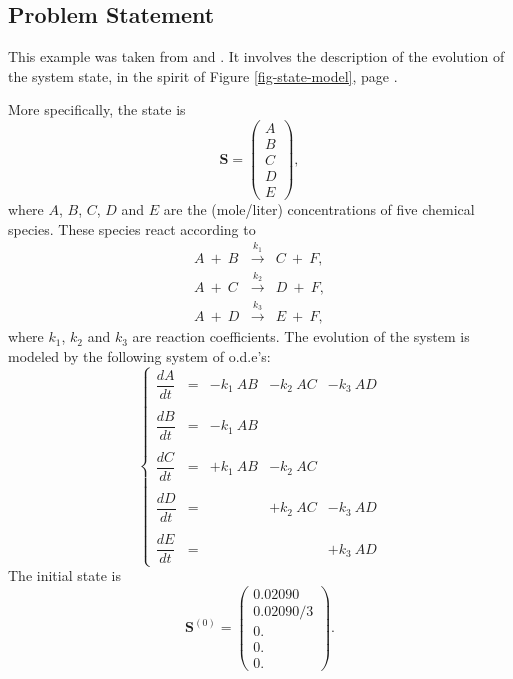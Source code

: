 \subsection{Problem Statement}\label{subsc-gmc-dram-chem-ex-prob-statement}

This example was taken from \cite{mcmctool} and \cite[ex. 9.9, page 326]{Hi70}.
It involves the description of the evolution of the system state, in the spirit of Figure \ref{fig-state-model}, page \pageref{fig-state-model}.

More specifically, the state is
\begin{equation*}
\mathbf{S}=
\left(
\begin{array}{c}
A \\
B \\
C \\
D \\
E
\end{array}
\right),
\end{equation*}
where $A$, $B$, $C$, $D$ and $E$ are the (mole/liter) concentrations of five chemical species.
These species react according to 
\begin{eqnarray*}
A~+~B & \xrightarrow{~k_1~} & C~+~F,\\
A~+~C & \xrightarrow{~k_2~} & D~+~F,\\
A~+~D & \xrightarrow{~k_3~} & E~+~F,
\end{eqnarray*}
where $k_1$, $k_2$ and $k_3$ are reaction coefficients.
The evolution of the system is modeled by the following system of o.d.e's:
\begin{equation*}
\left\{
\begin{array}{ccccc}
\dfrac{dA}{dt} & = & -k_1~AB & -k_2~AC & -k_3~AD \\
& & & & \\
\dfrac{dB}{dt} & = & -k_1~AB &         &         \\
& & & & \\
\dfrac{dC}{dt} & = & +k_1~AB & -k_2~AC &         \\
& & & & \\
\dfrac{dD}{dt} & = &         & +k_2~AC & -k_3~AD \\
& & & & \\
\dfrac{dE}{dt} & = &         &         & +k_3~AD
\end{array}
\right.
\end{equation*}
The initial state is
\begin{equation*}
\mathbf{S}^{(0)} =
\left(
\begin{array}{c}
0.02090   \\
0.02090/3 \\
0.        \\
0.        \\
0.
\end{array}
\right).
\end{equation*}


